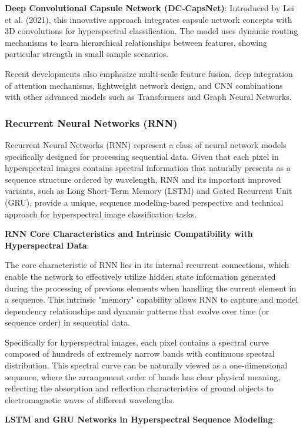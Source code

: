 \documentclass[journal]{IEEEtran}
\begin{document}
\textbf{Deep Convolutional Capsule Network (DC-CapsNet)}: Introduced by Lei et al. (2021), this innovative approach integrates capsule network concepts with 3D convolutions for hyperspectral classification. The model uses dynamic routing mechanisms to learn hierarchical relationships between features, showing particular strength in small sample scenarios.

Recent developments also emphasize multi-scale feature fusion, deep integration of attention mechanisms, lightweight network design, and CNN combinations with other advanced models such as Transformers and Graph Neural Networks.

\subsubsection{Recurrent Neural Networks (RNN)}

Recurrent Neural Networks (RNN) represent a class of neural network models specifically designed for processing sequential data. Given that each pixel in hyperspectral images contains spectral information that naturally presents as a sequence structure ordered by wavelength, RNN and its important improved variants, such as Long Short-Term Memory (LSTM) and Gated Recurrent Unit (GRU), provide a unique, sequence modeling-based perspective and technical approach for hyperspectral image classification tasks.

\textbf{RNN Core Characteristics and Intrinsic Compatibility with Hyperspectral Data}:

The core characteristic of RNN lies in its internal recurrent connections, which enable the network to effectively utilize hidden state information generated during the processing of previous elements when handling the current element in a sequence. This intrinsic "memory" capability allows RNN to capture and model dependency relationships and dynamic patterns that evolve over time (or sequence order) in sequential data.

Specifically for hyperspectral images, each pixel contains a spectral curve composed of hundreds of extremely narrow bands with continuous spectral distribution. This spectral curve can be naturally viewed as a one-dimensional sequence, where the arrangement order of bands has clear physical meaning, reflecting the absorption and reflection characteristics of ground objects to electromagnetic waves of different wavelengths.

\textbf{LSTM and GRU Networks in Hyperspectral Sequence Modeling}:
\end{document}
